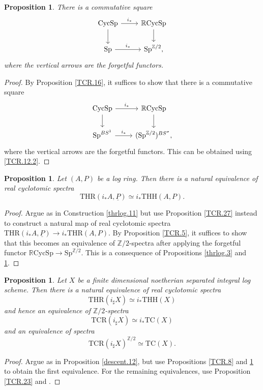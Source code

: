 \documentclass[10pt]{amsart}
\newtheorem{prop}[thm]{Proposition}
\theoremstyle{definition}
\theoremstyle{remark}
\numberwithin{equation}{section}
\newcommand{\Z}{\mathbb{Z}}
\newcommand{\ul}{\underline}
\newcommand{\Sp}{\mathrm{Sp}}
\newcommand{\CycSp}{\mathrm{CycSp}}
\newcommand{\RCycSp}{\mathbb{R}\mathrm{CycSp}}
\newcommand{\THH}{\mathrm{THH}}
\newcommand{\THR}{\mathrm{THR}}
\newcommand{\TC}{\mathrm{TC}}
\newcommand{\TCR}{\mathrm{TCR}}
\begin{document}
\begin{prop}
\label{TCR.26}
There is a commutative square
\[
\begin{tikzcd}
\CycSp\ar[d]\ar[r,"i_*"]&
\RCycSp\ar[d]
\\
\Sp\ar[r,"i_*"]&
\Sp^{\Z/2},
\end{tikzcd}
\]
where the vertical arrows are the forgetful functors.
\end{prop}
\begin{proof}
By Proposition \ref{TCR.16},
it suffices to show that there is a commutative square
\[
\begin{tikzcd}
\CycSp\ar[d]\ar[r,"i_*"]&
\RCycSp\ar[d]
\\
\Sp^{BS^1}\ar[r,"i_*"]&
(\Sp^{\Z/2})^{BS^\sigma},
\end{tikzcd}
\]
where the vertical arrows are the forgetful functors.
This can be obtained using \eqref{TCR.12.2}.
\end{proof}


\begin{prop}
\label{TCR.25}
Let $(A,P)$ be a log ring.
Then there is a natural equivalence of real cyclotomic spectra
\[
\THR(i_*A,\ul{P})
\simeq
i_*\THH(A,P).
\]
\end{prop}
\begin{proof}
Argue as in Construction \ref{thrlog.11} but use Proposition \ref{TCR.27} instead to construct a natural map of real cyclotomic spectra $\THR(i_*A,\ul{P})\to i_*\THR(A,P)$.
By Proposition \ref{TCR.5},
it suffices to show that this becomes an equivalence of $\Z/2$-spectra after applying the forgetful functor $\RCycSp\to \Sp^{\Z/2}$.
This is a consequence of Propositions \ref{thrlog.3} and \ref{TCR.26}.
\end{proof}




\begin{prop}
\label{TCR.24}
Let $X$ be a finite dimensional noetherian separated integral log scheme.
Then there is a natural equivalence of real cyclotomic spectra
\[
\THR(i_\sharp X)
\simeq
i_*\THH(X)
\]
and hence an equivalence of $\Z/2$-spectra
\[
\TCR(i_\sharp X)
\simeq
i_*\TC(X)
\]
and an equivalence of spectra
\[
\TCR(i_\sharp X)^{\Z/2}
\simeq
\TC(X).
\]
\end{prop}
\begin{proof}
Argue as in Proposition \ref{descent.12}, but use Propositions \ref{TCR.8} and \ref{TCR.25} to obtain the first equivalence.
For the remaining equivalences,
use Proposition \ref{TCR.23} and \cite[Proposition A.2.7(2)]{THR}.
\end{proof}
\end{document}
